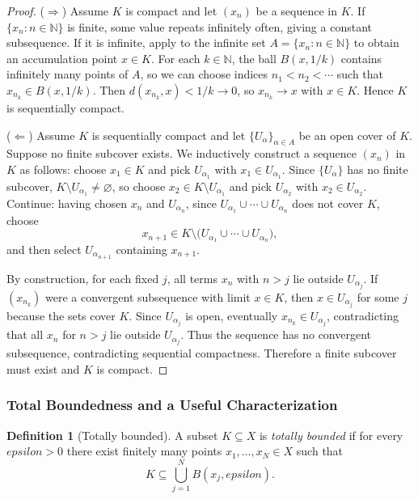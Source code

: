 \documentclass[12pt]{article}
\numberwithin{equation}{section}
\def\eps{epsilon}
\newcommand{\NN}{\mathbb{N}}
\let\emptyset\varnothing
\newcommand{\eps}{\varepsilon}               %
\theoremstyle{plain}
\theoremstyle{definition}
\newtheorem{definition}[theorem]{Definition}
\theoremstyle{remark}
\begin{document}
\begin{proof}
($\Rightarrow$) Assume $K$ is compact and let $(x_n)$ be a sequence in $K$.
If $\{x_n:n\in\NN\}$ is finite, some value repeats infinitely often, giving a constant subsequence.
If it is infinite, apply  to the infinite set $A=\{x_n:n\in\NN\}$ to obtain an accumulation point $x\in K$.
For each $k\in\NN$, the ball $B(x,1/k)$ contains infinitely many points of $A$,
so we can choose indices $n_1<n_2<\cdots$ such that $x_{n_k}\in B(x,1/k)$.
Then $d(x_{n_k},x)<1/k\to 0$, so $x_{n_k}\to x$ with $x\in K$. Hence $K$ is sequentially compact.

($\Leftarrow$) Assume $K$ is sequentially compact and let $\{U_\alpha\}_{\alpha\in A}$ be an open cover of $K$.
Suppose no finite subcover exists. We inductively construct a sequence $(x_n)$ in $K$ as follows:
choose $x_1\in K$ and pick $U_{\alpha_1}$ with $x_1\in U_{\alpha_1}$.
Since $\{U_\alpha\}$ has no finite subcover, $K\setminus U_{\alpha_1}\neq\emptyset$, so choose $x_2\in K\setminus U_{\alpha_1}$
and pick $U_{\alpha_2}$ with $x_2\in U_{\alpha_2}$.
Continue: having chosen $x_n$ and $U_{\alpha_n}$, since $U_{\alpha_1}\cup\cdots\cup U_{\alpha_n}$ does not cover $K$,
choose
\[
x_{n+1}\in K\setminus\bigl(U_{\alpha_1}\cup\cdots\cup U_{\alpha_n}\bigr),
\]
and then select $U_{\alpha_{n+1}}$ containing $x_{n+1}$.

By construction, for each fixed $j$, all terms $x_n$ with $n>j$ lie outside $U_{\alpha_j}$.
If $(x_{n_k})$ were a convergent subsequence with limit $x\in K$, then $x\in U_{\alpha_j}$ for some $j$
because the sets cover $K$.
Since $U_{\alpha_j}$ is open, eventually $x_{n_k}\in U_{\alpha_j}$, contradicting that all $x_n$ for $n>j$ lie outside $U_{\alpha_j}$.
Thus the sequence has no convergent subsequence, contradicting sequential compactness.
Therefore a finite subcover must exist and $K$ is compact.
\end{proof}

\subsubsection{Total Boundedness and a Useful Characterization}

\begin{definition}[Totally bounded]\label{ms:def:totally-bounded}
A subset $K\subseteq X$ is \emph{totally bounded} if for every $\eps>0$ there exist finitely many points $x_1,\dots,x_N\in X$ such that
\[
K\subseteq \bigcup_{j=1}^N B(x_j,\eps).
\]
\end{definition}
\end{document}
